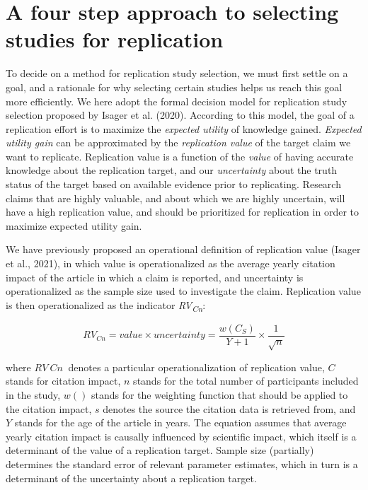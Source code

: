\documentclass[
  english,
  man,floatsintext]{apa6}
\begin{document}
\hypertarget{a-four-step-approach-to-selecting-studies-for-replication}{%
\section{A four step approach to selecting studies for replication}\label{a-four-step-approach-to-selecting-studies-for-replication}}

To decide on a method for replication study selection, we must first settle on a goal, and a rationale for why selecting certain studies helps us reach this goal more efficiently. We here adopt the formal decision model for replication study selection proposed by Isager et al. (2020). According to this model, the goal of a replication effort is to maximize the \emph{expected utility} of knowledge gained. \emph{Expected utility gain} can be approximated by the \emph{replication value} of the target claim we want to replicate. Replication value is a function of the \emph{value} of having accurate knowledge about the replication target, and our \emph{uncertainty} about the truth status of the target based on available evidence prior to replicating. Research claims that are highly valuable, and about which we are highly uncertain, will have a high replication value, and should be prioritized for replication in order to maximize expected utility gain.

We have previously proposed an operational definition of replication value (Isager et al., 2021), in which value is operationalized as the average yearly citation impact of the article in which a claim is reported, and uncertainty is operationalized as the sample size used to investigate the claim. Replication value is then operationalized as the indicator \emph{RV\textsubscript{Cn}}:

\begin{equation} 
  \tag{1}
  RV_{Cn} = value\times uncertainty = \frac{w(C_{S})}{Y+1}\times\frac{1}{\sqrt{n}}
  \label{eq:1}
\end{equation}

where \(RV~Cn~\) denotes a particular operationalization of replication value, \(C\) stands for citation impact, \(n\) stands for the total number of participants included in the study, \(w()\) stands for the weighting function that should be applied to the citation impact, \(s\) denotes the source the citation data is retrieved from, and \(Y\) stands for the age of the article in years. The equation assumes that average yearly citation impact is causally influenced by scientific impact, which itself is a determinant of the value of a replication target. Sample size (partially) determines the standard error of relevant parameter estimates, which in turn is a determinant of the uncertainty about a replication target.
\end{document}
